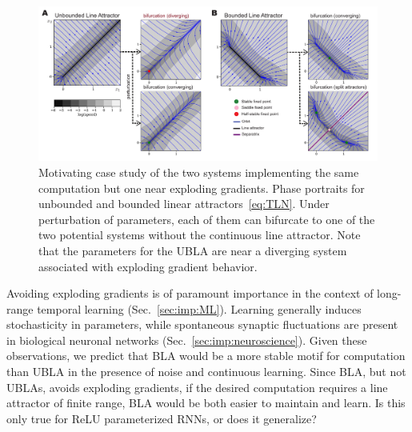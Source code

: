 \documentclass{article}
\newcounter{ct}
\theoremstyle{definition}
\theoremstyle{remark}
\begin{document}
\begin{figure}[tbhp]
  \centering
  \includegraphics[width=\textwidth]{figures/UBLABLA}
  \caption{Motivating case study of the two systems implementing the same computation but one near exploding gradients.
    Phase portraits for unbounded and bounded linear attractors~\eqref{eq:TLN}.
    Under perturbation of parameters, each of them can bifurcate to one of the two potential systems without the continuous line attractor.
    Note that the parameters for the UBLA are near a diverging system associated with exploding gradient behavior.
}
  \label{fig:ublabla}
\end{figure}

Avoiding exploding gradients is of paramount importance in the context of long-range temporal learning (Sec.~\ref{sec:imp:ML}).
Learning generally induces stochasticity in parameters, while spontaneous synaptic fluctuations are present in biological neuronal networks (Sec.~\ref{sec:imp:neuroscience}).
Given these observations, we predict that BLA would be a more stable motif for computation than UBLA in the presence of noise and continuous learning.
Since BLA, but not UBLAs, avoids exploding gradients, if the desired computation requires a line attractor of finite range, BLA would be both easier to maintain and learn.
Is this only true for ReLU parameterized RNNs, or does it generalize?
\end{document}
